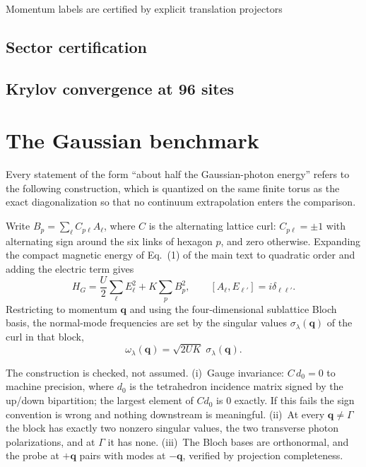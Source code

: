 \documentclass[aps,prl,twocolumn,amsmath,amssymb,superscriptaddress,
longbibliography,floatfix]{revtex4-2}
\newcommand{\bq}{\bm q}
\begin{document}
Momentum labels are certified by explicit translation projectors

\subsection{Sector certification}
\label{sm:sectors}


\subsection{Krylov convergence at 96 sites}
\label{sm:krylov}


\section{The Gaussian benchmark}
\label{sm:gaussian}


Every statement of the form ``about half the Gaussian-photon energy''
refers to the following construction, which is quantized on the same
finite torus as the exact diagonalization so that no continuum
extrapolation enters the comparison.

Write $B_p=\sum_\ell C_{p\ell}A_\ell$, where $C$ is the alternating
lattice curl: $C_{p\ell}=\pm1$ with alternating sign around the six
links of hexagon $p$, and zero otherwise. Expanding the compact
magnetic energy of Eq.~(1) of the main text to quadratic order and adding
the electric term gives
\begin{equation}
 H_G=\frac{U}{2}\sum_\ell E_\ell^2+K\sum_p B_p^2 ,
 \qquad [A_\ell,E_{\ell'}]=i\delta_{\ell\ell'} .
 \label{eq:hg}
\end{equation}
Restricting to momentum $\bq$ and using the four-dimensional
sublattice Bloch basis, the normal-mode frequencies are set by the
singular values $\sigma_\lambda(\bq)$ of the curl in that block,
\begin{equation}
 \omega_\lambda(\bq)=\sqrt{2UK}\;\sigma_\lambda(\bq) .
 \label{eq:gaussdisp}
\end{equation}

The construction is checked, not assumed. (i)~Gauge invariance:
$C\,d_0=0$ to machine precision, where $d_0$ is the tetrahedron
incidence matrix signed by the up/down bipartition; the largest
element of $Cd_0$ is $0$ exactly. If this fails the sign convention
is wrong and nothing downstream is meaningful. (ii)~At every
$\bq\neq\Gamma$ the block has exactly two nonzero singular values, the
two transverse photon polarizations, and at $\Gamma$ it has none.
(iii)~The Bloch bases are orthonormal, and the probe at $+\bq$ pairs
with modes at $-\bq$, verified by projection completeness.
\end{document}
